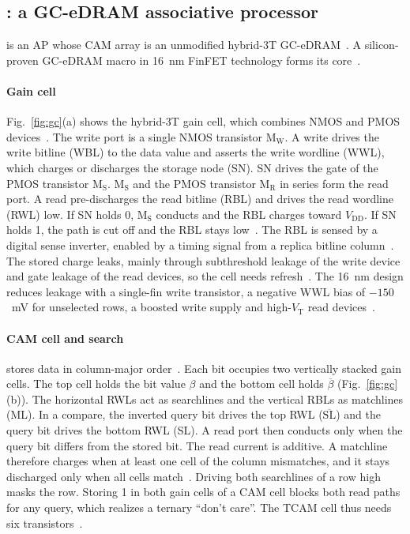 \subsection{\gainp{}: a GC-eDRAM associative processor}\label{sec:gainp}
\gainp{} is an AP whose CAM array is an unmodified hybrid-3T GC-eDRAM~\cite{levi2026gainp}.
A silicon-proven GC-eDRAM macro in 16~nm FinFET technology forms its core~\cite{levi2026gainp}.

\paragraph{Gain cell}
Fig.~\ref{fig:gc}(a) shows the hybrid-3T gain cell, which combines NMOS and PMOS devices~\cite{levi2026gainp}.
The write port is a single NMOS transistor M$_\mathrm{W}$.
A write drives the write bitline (WBL) to the data value and asserts the write wordline (WWL), which charges or discharges the storage node (SN).
SN drives the gate of the PMOS transistor M$_\mathrm{S}$. M$_\mathrm{S}$ and the PMOS transistor M$_\mathrm{R}$ in series form the read port.
A read pre-discharges the read bitline (RBL) and drives the read wordline (RWL) low.
If SN holds 0, M$_\mathrm{S}$ conducts and the RBL charges toward $V_\mathrm{DD}$. If SN holds 1, the path is cut off and the RBL stays low~\cite{levi2026gainp}.
The RBL is sensed by a digital sense inverter, enabled by a timing signal from a replica bitline column~\cite{levi2026gainp}.
The stored charge leaks, mainly through subthreshold leakage of the write device and gate leakage of the read devices, so the cell needs refresh~\cite{levi2026gainp}.
The 16~nm design reduces leakage with a single-fin write transistor, a negative WWL bias of $-150$~mV for unselected rows, a boosted write supply and high-$V_\mathrm{T}$ read devices~\cite{levi2026gainp}.

\paragraph{CAM cell and search}
\gainp{} stores data in column-major order~\cite{levi2026gainp}.
Each bit occupies two vertically stacked gain cells. The top cell holds the bit value $\beta$ and the bottom cell holds $\overline{\beta}$ (Fig.~\ref{fig:gc}(b)).
The horizontal RWLs act as searchlines and the vertical RBLs as matchlines (ML).
In a compare, the inverted query bit drives the top RWL ($\overline{\mathrm{SL}}$) and the query bit drives the bottom RWL (SL).
A read port then conducts only when the query bit differs from the stored bit.
The read current is additive. A matchline therefore charges when at least one cell of the column mismatches, and it stays discharged only when all cells match~\cite{levi2026gainp}.
Driving both searchlines of a row high masks the row.
Storing 1 in both gain cells of a CAM cell blocks both read paths for any query, which realizes a ternary ``don't care''.
The \gainp{} TCAM cell thus needs six transistors~\cite{levi2026gainp}.

